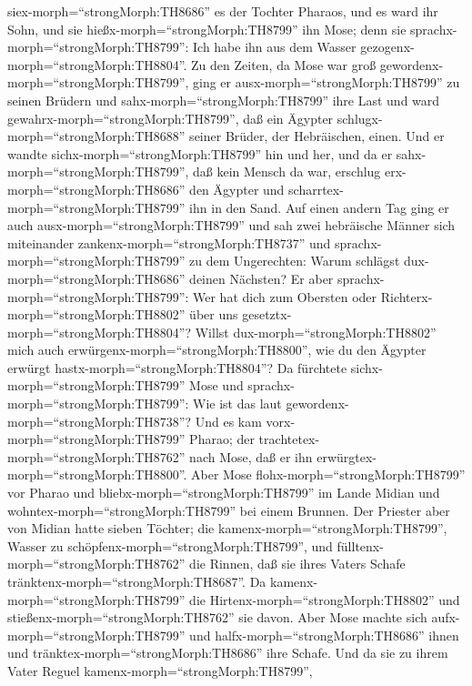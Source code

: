 siex-morph=``strongMorph:TH8686'' es der Tochter Pharaos, und es ward
ihr Sohn, und sie hießx-morph=``strongMorph:TH8799'' ihn Mose; denn sie
sprachx-morph=``strongMorph:TH8799'': Ich habe ihn aus dem Wasser
gezogenx-morph=``strongMorph:TH8804''.  Zu den Zeiten, da
Mose war groß gewordenx-morph=``strongMorph:TH8799'', ging er
ausx-morph=``strongMorph:TH8799'' zu seinen Brüdern und
sahx-morph=``strongMorph:TH8799'' ihre Last und ward
gewahrx-morph=``strongMorph:TH8799'', daß ein Ägypter
schlugx-morph=``strongMorph:TH8688'' seiner Brüder, der Hebräischen,
einen.  Und er wandte sichx-morph=``strongMorph:TH8799''
hin und her, und da er sahx-morph=``strongMorph:TH8799'', daß kein
Mensch da war, erschlug erx-morph=``strongMorph:TH8686'' den Ägypter und
scharrtex-morph=``strongMorph:TH8799'' ihn in den Sand. 
Auf einen andern Tag ging er auch ausx-morph=``strongMorph:TH8799'' und
sah zwei hebräische Männer sich miteinander
zankenx-morph=``strongMorph:TH8737'' und
sprachx-morph=``strongMorph:TH8799'' zu dem Ungerechten: Warum schlägst
dux-morph=``strongMorph:TH8686'' deinen Nächsten?  Er aber
sprachx-morph=``strongMorph:TH8799'': Wer hat dich zum Obersten oder
Richterx-morph=``strongMorph:TH8802'' über uns
gesetztx-morph=``strongMorph:TH8804''? Willst
dux-morph=``strongMorph:TH8802'' mich auch
erwürgenx-morph=``strongMorph:TH8800'', wie du den Ägypter erwürgt
hastx-morph=``strongMorph:TH8804''? Da fürchtete
sichx-morph=``strongMorph:TH8799'' Mose und
sprachx-morph=``strongMorph:TH8799'': Wie ist das laut
gewordenx-morph=``strongMorph:TH8738''?  Und es kam
vorx-morph=``strongMorph:TH8799'' Pharao; der
trachtetex-morph=``strongMorph:TH8762'' nach Mose, daß er ihn
erwürgtex-morph=``strongMorph:TH8800''. Aber Mose
flohx-morph=``strongMorph:TH8799'' vor Pharao und
bliebx-morph=``strongMorph:TH8799'' im Lande Midian und
wohntex-morph=``strongMorph:TH8799'' bei einem Brunnen. 
Der Priester aber von Midian hatte sieben Töchter; die
kamenx-morph=``strongMorph:TH8799'', Wasser zu
schöpfenx-morph=``strongMorph:TH8799'', und
fülltenx-morph=``strongMorph:TH8762'' die Rinnen, daß sie ihres Vaters
Schafe tränktenx-morph=``strongMorph:TH8687''.  Da
kamenx-morph=``strongMorph:TH8799'' die
Hirtenx-morph=``strongMorph:TH8802'' und
stießenx-morph=``strongMorph:TH8762'' sie davon. Aber Mose machte sich
aufx-morph=``strongMorph:TH8799'' und halfx-morph=``strongMorph:TH8686''
ihnen und tränktex-morph=``strongMorph:TH8686'' ihre Schafe.
 Und da sie zu ihrem Vater Reguel
kamenx-morph=``strongMorph:TH8799'',
